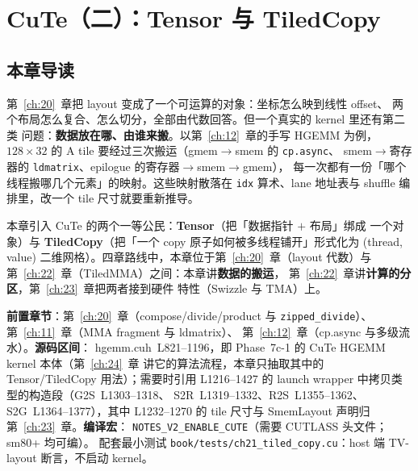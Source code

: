 \makeatletter
\providecommand{\urlchbrk}[1]{\@tfor\next:=#1\do{\next\allowbreak}}
\makeatother
\providecommand{\url}[1]{{\ttfamily\urlchbrk{#1}}}
\chapter{CuTe（二）：Tensor 与 TiledCopy}\label{ch:21}

\section{本章导读}

第~\ref{ch:20}~章把 layout 变成了一个可运算的对象：坐标怎么映到线性 offset、
两个布局怎么复合、怎么切分，全部由代数回答。但一个真实的 kernel 里还有第二类
问题：\textbf{数据放在哪、由谁来搬}。以第~\ref{ch:12}~章的手写 HGEMM 为例，
$128\times32$ 的 A tile 要经过三次搬运（gmem$\to$smem 的 \texttt{cp.async}、
smem$\to$寄存器的 \texttt{ldmatrix}、epilogue 的寄存器$\to$smem$\to$gmem），
每一次都有一份「哪个线程搬哪几个元素」的映射。这些映射散落在
\texttt{idx} 算术、lane 地址表与 shuffle 编排里，改一个 tile 尺寸就要重新推导。

本章引入 CuTe 的两个一等公民：\textbf{Tensor}（把「数据指针 $+$ 布局」绑成
一个对象）与 \textbf{TiledCopy}（把「一个 copy 原子如何被多线程铺开」形式化为
(thread, value) 二维网格）。四章路线中，本章位于第~\ref{ch:20}~章（layout
代数）与第~\ref{ch:22}~章（TiledMMA）之间：本章讲\textbf{数据的搬运}，
第~\ref{ch:22}~章讲\textbf{计算的分区}，第~\ref{ch:23}~章把两者接到硬件
特性（Swizzle 与 TMA）上。

\textbf{前置章节}：第~\ref{ch:20}~章（compose/divide/product 与
\texttt{zipped\_\allowbreak{}divide}）、第~\ref{ch:11}~章（MMA fragment 与 ldmatrix）、
第~\ref{ch:12}~章（cp.async 与多级流水）。\textbf{源码区间}：
hgemm.cuh~L821--1196，即 Phase~7c-1 的 CuTe HGEMM kernel 本体（第~\ref{ch:24}~章
讲它的算法流程，本章只抽取其中的 Tensor/TiledCopy 用法）；需要时引用
L1216--1427 的 launch wrapper 中拷贝类型的构造段（G2S~L1303--1318、
S2R~L1319--1332、R2S~L1355--1362、S2G~L1364--1377），其中 L1232--1270 的
tile 尺寸与 SmemLayout 声明归第~\ref{ch:23}~章。\textbf{编译宏}：
\texttt{NOTES\_\allowbreak{}V2\_\allowbreak{}ENABLE\_\allowbreak{}CUTE}（需要 CUTLASS 头文件；sm80+ 均可编）。
配套最小测试 \texttt{book/\allowbreak{}tests/\allowbreak{}ch21\_\allowbreak{}tiled\_\allowbreak{}copy.cu}：host 端 TV-layout
断言，不启动 kernel。

